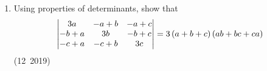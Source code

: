 \begin{enumerate}[label=\thesubsection.\arabic*, ref=\thesubsection.\theenumi]
\solution
From \eqref{eq:CBSE12-2019-arccos_to_arctan}, converting $\cos^{-1}\brak{\frac{4}{5}}$ to $\tan^{-1}$:
\begin{align}
	\cos^{-1}\frac{4}{5} = \tan^{-1}\left(\frac{\sqrt{1 - \brak{4/5}^2}}{4/5}\right) = \tan^{-1}\left(\frac{3/5}{4/5}\right) = \tan^{-1}\frac{3}{4}
\end{align}
Using the addition formula \eqref{eq:CBSE12-2019-arctan_add} for $\tan^{-1}\frac{3}{4} + \tan^{-1}\frac{2}{3}$ (since $uv = \frac{3}{4}\cdot\frac{2}{3} = \frac{1}{2} < 1$):
\begin{align}
	\tan^{-1}\frac{3}{4} + \tan^{-1}\frac{2}{3} &= \tan^{-1}\left(\frac{\frac{3}{4} + \frac{2}{3}}{1 - \frac{3}{4} \cdot \frac{2}{3}}\right) \\
	&= \tan^{-1}\left(\frac{\frac{17}{12}}{1 - \frac{6}{12}}\right) = \tan^{-1}\left(\frac{17/12}{6/12}\right) = \tan^{-1}\frac{17}{6}
\end{align}
Let $\theta = \tan^{-1}\frac{17}{6}$. From \eqref{eq:CBSE12-2019-sin_arctan}:
\begin{align}
	\sin\brak{\tan^{-1}\frac{17}{6}} = \frac{17}{\sqrt{17^2 + 6^2}} = \frac{17}{\sqrt{289 + 36}} = \frac{17}{\sqrt{325}} = \frac{17}{5\sqrt{13}} = \frac{17\sqrt{13}}{65}
\end{align}


\item Using properties of determinants, show that
\begin{align}
	\begin{vmatrix}
		3a & -a+b & -a+c \\
		-b+a & 3b & -b+c \\
		-c+a & -c+b & 3c
	\end{vmatrix} = 3\left(a+b+c\right)\left(ab+bc+ca\right)
\end{align}
\hfill (12~2019)


\end{enumerate}
